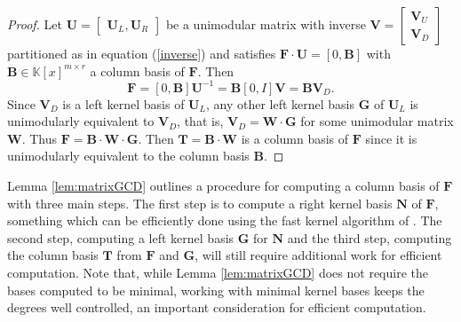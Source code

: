 \begin{proof}
Let $\mathbf{U}=\begin{bmatrix}\mathbf{U}_{L},\mathbf{U}_{R}\end{bmatrix}$
be a unimodular matrix with inverse $\mathbf{V}=\begin{bmatrix}\mathbf{V}_{U}\\
\mathbf{V}_{D}
\end{bmatrix}$ partitioned as in equation (\ref{inverse}) and satisfies $\mathbf{F}\cdot\mathbf{U}=\left[0,\mathbf{B}\right]$
with $\mathbf{B}\in\mathbb{K}\left[x\right]^{m\times r}$ a column
basis of $\mathbf{F}$. Then %
\[
\mathbf{F}=\left[0,\mathbf{B}\right]\mathbf{U}^{-1}=\mathbf{B}\left[0,I\right]\mathbf{V}=\mathbf{B}\mathbf{V}_{D}.
\]
Since $\mathbf{V}_{D}$ is a left kernel basis of\textbf{ $\mathbf{U}_{L}$},
any other left kernel basis $\mathbf{G}$ of $\mathbf{U}_{L}$ is
unimodularly equivalent to $\mathbf{V}_{D}$, that is, $\mathbf{V}_{D}=\mathbf{W}\cdot\mathbf{G}$
for some unimodular matrix $\mathbf{W}$. Thus $\mathbf{F}=\mathbf{B\cdot W}\cdot\mathbf{G}$.
Then $\mathbf{T}=\mathbf{B\cdot W}$ is a column basis of $\mathbf{F}$
since it is unimodularly equivalent to the column basis $\mathbf{B}$. 
\end{proof}
Lemma \ref{lem:matrixGCD} outlines a procedure for computing a column
basis of $\mathbf{F}$ with three main steps. The first step is to
compute a right kernel basis $\mathbf{N}$ of $\mathbf{F}$, something
which can be efficiently done using the fast kernel algorithm of \cite{za2012}.
The second step, computing a left kernel basis $\mathbf{G}$ for $\mathbf{N}$
 and the third step, computing the column basis $\mathbf{T}$ from
$\mathbf{F}$ and $\mathbf{G}$, will still require additional work
for efficient computation. Note that, while Lemma \ref{lem:matrixGCD}
does not require the bases computed to be minimal, working with minimal
kernel bases keeps the degrees well controlled, an important consideration
for efficient computation.
